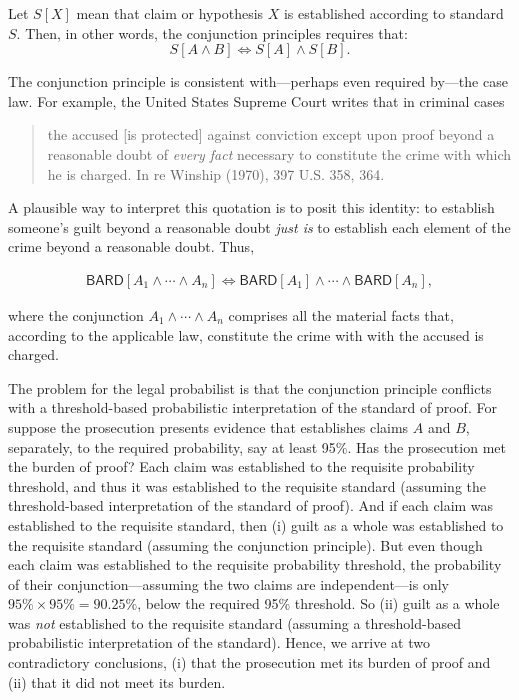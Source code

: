 \documentclass[10pt,dvipsnames,enabledeprecatedfontcommands]{scrartcl}
\newcommand{\et}{\wedge}
\begin{document}
\noindent Let \(S[X]\) mean that claim or hypothesis \(X\) is
established according to standard \(S\). Then, in other words, the
conjunction principles requires that:
\[S[A \wedge B] \Leftrightarrow S[A] \wedge S[B].\]

The conjunction principle is consistent with---perhaps even required
by---the case law. For example, the United States Supreme Court writes
that in criminal cases

\begin{quote}
the accused [is protected] against conviction except upon proof beyond a reasonable doubt of \textit{every fact} necessary to constitute the crime with which he is charged. In re Winship (1970), 397 U.S. 358, 364. 
\end{quote}

\noindent A plausible way to interpret this quotation is to posit this
identity: to establish someone's guilt beyond a reasonable doubt
\textit{just is} to establish each element of the crime beyond a
reasonable doubt. Thus,

\begin{align*}\mathsf{BARD}[A_1 \wedge \cdots \wedge A_n] \Leftrightarrow \mathsf{BARD}[A_1] \wedge \cdots \wedge \mathsf{BARD}[A_n],
\end{align*}

\noindent where the conjunction \(A_1 \et \cdots \et A_n\) comprises all
the material facts that, according to the applicable law, constitute the
crime with with the accused is charged.

The problem for the legal probabilist is that the conjunction principle
conflicts with a threshold-based probabilistic interpretation of the
standard of proof. For suppose the prosecution presents evidence that
establishes claims \(A\) and \(B\), separately, to the required
probability, say at least 95\%. Has the prosecution met the burden of
proof? Each claim was established to the requisite probability
threshold, and thus it was established to the requisite standard
(assuming the threshold-based interpretation of the standard of proof).
And if each claim was established to the requisite standard, then (i)
guilt as a whole was established to the requisite standard (assuming the
conjunction principle). But even though each claim was established to
the requisite probability threshold, the probability of their
conjunction---assuming the two claims are independent---is only
\(95\%\times95\%=90.25\%\), below the required 95\% threshold. So (ii)
guilt as a whole was \textit{not} established to the requisite standard
(assuming a threshold-based probabilistic interpretation of the
standard). Hence, we arrive at two contradictory conclusions, (i) that
the prosecution met its burden of proof and (ii) that it did not meet
its burden.
\end{document}
